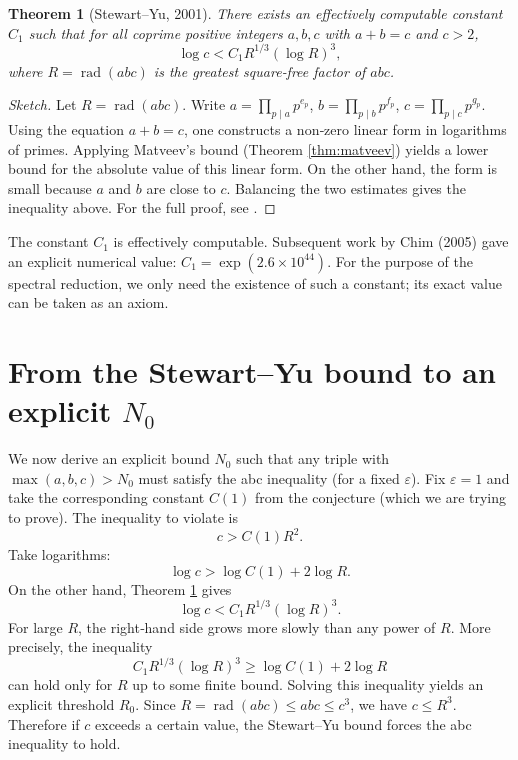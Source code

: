 \documentclass[11pt,a4paper]{article}
\newtheorem{theorem}{Theorem}[section]
\begin{document}
\begin{theorem}[Stewart–Yu, 2001]
\label{thm:stewart-yu}
There exists an effectively computable constant \(C_1\) such that for all coprime positive integers \(a,b,c\) with \(a+b=c\) and \(c>2\),
\[
\log c < C_1 R^{1/3} (\log R)^3,
\]
where \(R = \operatorname{rad}(abc)\) is the greatest square‑free factor of \(abc\).
\end{theorem}

\begin{proof}[Sketch]
Let \(R = \operatorname{rad}(abc)\). Write \(a = \prod_{p\mid a} p^{e_p}\), \(b = \prod_{p\mid b} p^{f_p}\), \(c = \prod_{p\mid c} p^{g_p}\). Using the equation \(a+b=c\), one constructs a non‑zero linear form in logarithms of primes. Applying Matveev's bound (Theorem \ref{thm:matveev}) yields a lower bound for the absolute value of this linear form. On the other hand, the form is small because \(a\) and \(b\) are close to \(c\). Balancing the two estimates gives the inequality above. For the full proof, see \cite{stewart-yu2001}.
\end{proof}

The constant \(C_1\) is effectively computable. Subsequent work by Chim (2005) gave an explicit numerical value: \(C_1 = \exp(2.6\times 10^{44})\). For the purpose of the spectral reduction, we only need the existence of such a constant; its exact value can be taken as an axiom.

\section{From the Stewart–Yu bound to an explicit \(N_0\)}

We now derive an explicit bound \(N_0\) such that any triple with \(\max(a,b,c) > N_0\) must satisfy the abc inequality (for a fixed \(\varepsilon\)). Fix \(\varepsilon = 1\) and take the corresponding constant \(C(1)\) from the conjecture (which we are trying to prove). The inequality to violate is
\[
c > C(1) R^{2}.
\]
Take logarithms:
\[
\log c > \log C(1) + 2\log R.
\]
On the other hand, Theorem \ref{thm:stewart-yu} gives
\[
\log c < C_1 R^{1/3} (\log R)^3.
\]
For large \(R\), the right‑hand side grows more slowly than any power of \(R\). More precisely, the inequality
\[
C_1 R^{1/3} (\log R)^3 \ge \log C(1) + 2\log R
\]
can hold only for \(R\) up to some finite bound. Solving this inequality yields an explicit threshold \(R_0\). Since \(R = \operatorname{rad}(abc) \le abc \le c^3\), we have \(c \le R^{3}\). Therefore if \(c\) exceeds a certain value, the Stewart–Yu bound forces the abc inequality to hold.
\end{document}
